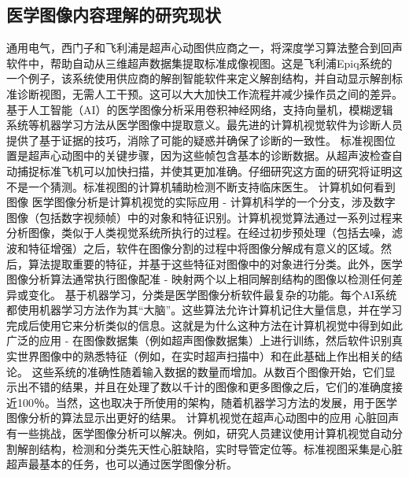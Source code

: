 \subsection{医学图像内容理解的研究现状}
通用电气，西门子和飞利浦是超声心动图供应商之一，将深度学习算法整合到回声软件中，帮助自动从三维超声数据集提取标准成像视图。这是飞利浦Epiq系统的一个例子，该系统使用供应商的解剖智能软件来定义解剖结构，并自动显示解剖标准诊断视图，无需人工干预。这可以大大加快工作流程并减少操作员之间的差异。
基于人工智能（AI）的医学图像分析采用卷积神经网络，支持向量机，模糊逻辑系统等机器学习方法从医学图像中提取意义。最先进的计算机视觉软件为诊断人员提供了基于证据的技巧，消除了可能的疑惑并确保了诊断的一致性。
标准视图位置是超声心动图中的关键步骤，因为这些帧包含基本的诊断数据。从超声波检查自动捕捉标准飞机可以加快扫描，并使其更加准确。仔细研究这方面的研究将证明这不是一个猜测。标准视图的计算机辅助检测不断支持临床医生。
计算机如何看到图像
医学图像分析是计算机视觉的实际应用 - 计算机科学的一个分支，涉及数字图像（包括数字视频帧）中的对象和特征识别。计算机视觉算法通过一系列过程来分析图像，类似于人类视觉系统所执行的过程。在经过初步预处理（包括去噪，滤波和特征增强）之后，软件在图像分割的过程中将图像分解成有意义的区域。然后，算法提取重要的特征，并基于这些特征对图像中的对象进行分类。此外，医学图像分析算法通常执行图像配准 - 映射两个以上相同解剖结构的图像以检测任何差异或变化。
基于机器学习，分类是医学图像分析软件最复杂的功能。每个AI系统都使用机器学习方法作为其“大脑”。这些算法允许计算机记住大量信息，并在学习完成后使用它来分析类似的信息。这就是为什么这种方法在计算机视觉中得到如此广泛的应用 - 在图像数据集（例如超声图像数据集）上进行训练，然后软件识别真实世界图像中的熟悉特征（例如，在实时超声扫描中）和在此基础上作出相关的结论。
这些系统的准确性随着输入数据的数量而增加。从数百个图像开始，它们显示出不错的结果，并且在处理了数以千计的图像和更多图像之后，它们的准确度接近100％。当然，这也取决于所使用的架构，随着机器学习方法的发展，用于医学图像分析的算法显示出更好的结果。
计算机视觉在超声心动图中的应用
心脏回声有一些挑战，医学图像分析可以解决。例如，研究人员建议使用计算机视觉自动分割解剖结构，检测和分类先天性心脏缺陷，实时导管定位等。标准视图采集是心脏超声最基本的任务，也可以通过医学图像分析。

